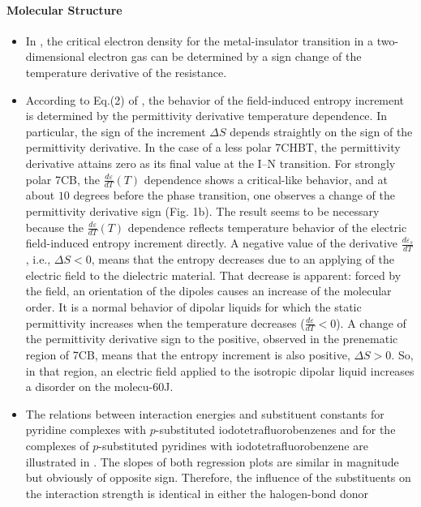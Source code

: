 \documentclass[11pt]{book}
\begin{document}
\paragraph{Molecular Structure}
\begin{itemize}
\item In \cite{shashkin2001metal},
the critical electron density for the metal-insulator transition in
a two-dimensional electron gas can be determined by a sign change
of the temperature derivative of the resistance.
\item According to Eq.(2) of \cite{jadzyn2007interactions},
the behavior of the field-induced entropy increment is determined
by the permittivity derivative temperature dependence. In particular,
the sign of the increment $\Delta S$ depends straightly on the sign
of the permittivity derivative. In the case of a less polar 7CHBT,
the permittivity derivative attains zero as its final value at the
I--N transition. For strongly polar 7CB, the $\frac{d\varepsilon}{dT}\left(T\right)$
dependence shows a critical-like behavior, and at about $10$ degrees
before the phase transition, one observes a change of the permittivity
derivative sign (Fig. 1b). The result seems to be necessary because
the $\frac{d\varepsilon}{dT}\left(T\right)$ dependence reflects temperature
behavior of the electric field-induced entropy increment directly.
A negative value of the derivative $\frac{d\varepsilon_{s}}{dT}$,
i.e., $\Delta S<0$, means that the entropy decreases due to an applying
of the electric field to the dielectric material. That decrease is
apparent: forced by the field, an orientation of the dipoles causes
an increase of the molecular order. It is a normal behavior of dipolar
liquids for which the static permittivity increases when the temperature
decreases ($\frac{d\varepsilon}{dT}<0$). A change of the permittivity
derivative sign to the positive, observed in the prenematic region
of 7CB, means that the entropy increment is also positive, $\Delta S>0$.
So, in that region, an electric field applied to the isotropic dipolar
liquid increases a disorder on the molecu-60J.
\item The relations between interaction energies and substituent constants
for pyridine complexes with $p$-substituted iodotetrafluorobenzenes
and for the complexes of $p$-substituted pyridines with iodotetrafluorobenzene
are illustrated in \cite{szatylowicz2015substituent}.
The slopes of both regression plots are similar in magnitude but obviously
of opposite sign. Therefore, the influence of the substituents on
the interaction strength is identical in either the halogen-bond donor

\end{itemize}
\end{document}

